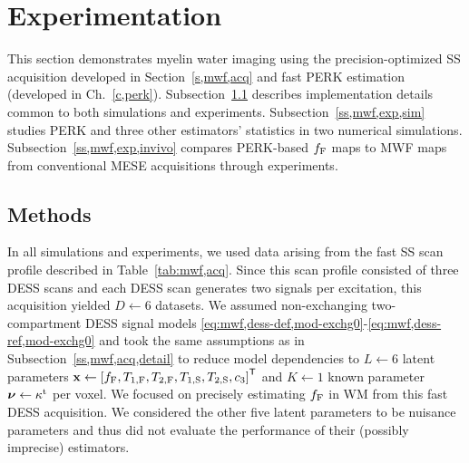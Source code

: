\section{Experimentation}
\label{s,mwf,exp}

This section demonstrates myelin water imaging
using the precision-optimized SS acquisition
developed in Section~\ref{s,mwf,acq}
and fast PERK estimation
(developed in Ch.~\ref{c,perk}). 
Subsection~\ref{ss,mwf,exp,meth}
describes implementation details
common to both simulations and experiments.
Subsection~\ref{ss,mwf,exp,sim}
studies PERK and three other estimators' statistics
in two numerical simulations.
Subsection~\ref{ss,mwf,exp,invivo}
compares PERK-based $f_{\mathrm{F}}$ maps
to MWF maps 
from conventional MESE acquisitions
through \invivo experiments.

\subsection{Methods}
\label{ss,mwf,exp,meth}

In all simulations and experiments,
we used data arising 
from the fast SS scan profile 
described in Table~\ref{tab:mwf,acq}.
Since this scan profile
consisted of three DESS scans
and each DESS scan 
generates two signals per excitation,
this acquisition yielded $D \gets 6$ datasets.
We assumed non-exchanging two-compartment DESS signal models
\eqref{eq:mwf,dess-def,mod-exchg0}-\eqref{eq:mwf,dess-ref,mod-exchg0}
and took the same assumptions
as in Subsection~\ref{ss,mwf,acq,detail}
to reduce model dependencies
to $L \gets 6$ latent parameters 
$\bmx \gets \brac{\ff,\tf{1},\tf{2},\ts{1},\ts{2},\const{3}}\tpose$
and $K \gets 1$ known parameter 
$\boldsymbol{\nu} \gets \kappa^{\mathrm{t}}$ 
per voxel.
We focused on precisely estimating $f_{\mathrm{F}}$ in WM 
from this fast DESS acquisition.
We considered the other five latent parameters
to be nuisance parameters
and thus did not evaluate the performance 
of their (possibly imprecise) estimators.

